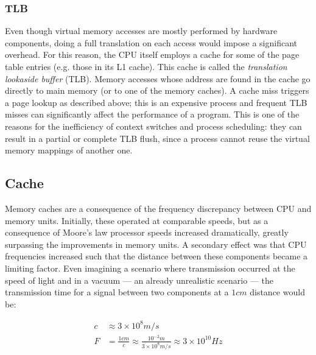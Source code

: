 
\subsubsection{TLB}

Even though virtual memory accesses are mostly performed by hardware components,
doing a full translation on each access would impose a significant overhead.
For this reason, the CPU itself employs a cache for some of the page table
entries (e.g. those in its L1 cache).  This cache is called the
\textit{translation lookaside buffer} (TLB).  Memory accesses whose address are
found in the cache go directly to main memory (or to one of the memory caches).
A cache miss triggers a page lookup as described above; this is an expensive
process and frequent TLB misses can significantly affect the performance of a
program.  This is one of the reasons for the inefficiency of context switches
and process scheduling: they can result in a partial or complete TLB flush,
since a process cannot reuse the virtual memory mappings of another one.

\subsection{Cache}

\label{subsec:arch:cache}

Memory caches are a consequence of the frequency discrepancy between CPU and
memory units.  Initially, these operated at comparable speeds, but as a
consequence of Moore's law processor speeds increased dramatically, greatly
surpassing the improvements in memory units.  A secondary effect was that CPU
frequencies increased such that the distance between these components became a
limiting factor.  Even imagining a scenario where transmission occurred at the
speed of light and in a vacuum --- an already unrealistic scenario --- the
transmission time for a signal between two components at a $1cm$ distance would
be:

\begin{align*}
    c &\approx 3 \times 10^8m/s \\
    F &= \frac{1cm}{c}
       \approx \frac{10^{-2}m}{3 \times 10^8m/s}
       \approx 3 \times 10^{10}Hz \\
\end{align*}

